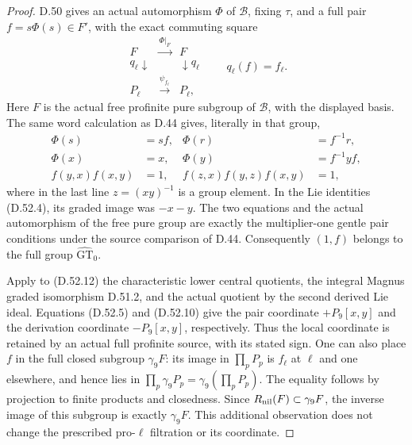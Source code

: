 \begin{proof}
D.50 gives an actual automorphism \(\Phi\) of
\(\mathcal B\), fixing \(\tau\), and a full pair
\(f=s\Phi(s)\in F'\), with the exact commuting square
\[
 \begin{array}{ccc}
 F&\xrightarrow{\Phi|_F}&F\\
 q_\ell\downarrow&&\downarrow q_\ell\\
 P_\ell&\xrightarrow{\psi_{f_\ell}}&P_\ell,
 \end{array}
 \qquad q_\ell(f)=f_\ell.
 \tag{D.52.12}
\]
Here \(F\) is the actual free profinite pure subgroup of
\(\mathcal B\), with the displayed basis. The same word
calculation as D.44 gives, literally in that group,
\[
 \begin{aligned}
  \Phi(s)&=sf,&\Phi(r)&=f^{-1}r,\\
  \Phi(x)&=x,&\Phi(y)&=f^{-1}yf,\\
  f(y,x)f(x,y)&=1,&
  f(z,x)f(y,z)f(x,y)&=1,
 \end{aligned}
 \tag{D.52.13}
\]
where in the last line \(z=(xy)^{-1}\) is a group element.
In the Lie identities \textup{(D.52.4)}, its graded image
was \(-x-y\). The two equations and the actual automorphism
of the free pure group are exactly the multiplier-one gentle
pair conditions under the source comparison of D.44.
Consequently \((1,f)\) belongs to the full group
\(\widehat{\mathrm{GT}}_0\).

Apply to \textup{(D.52.12)} the characteristic lower central
quotients, the integral Magnus graded isomorphism D.51.2,
and the actual quotient by the second derived Lie ideal.
Equations \textup{(D.52.5)} and \textup{(D.52.10)} give
the pair coordinate \(+P_9[x,y]\) and the derivation
coordinate \(-P_9[x,y]\), respectively. Thus the local
coordinate is retained by an actual full profinite source,
with its stated sign. One can also place \(f\) in the
full closed subgroup \(\gamma_9F\): its image in
\(\prod_pP_p\) is \(f_\ell\) at \(\ell\) and one
elsewhere, and hence lies in
\(\prod_p\gamma_9P_p=\gamma_9(\prod_pP_p)\).
The equality follows by projection to finite products and
closedness. Since \(R_{\rm nil}(F)\subset\gamma_9F\),
the inverse image of this subgroup is exactly \(\gamma_9F\).
This additional observation does not change the prescribed
pro-\(\ell\) filtration or its coordinate.


\end{proof}
